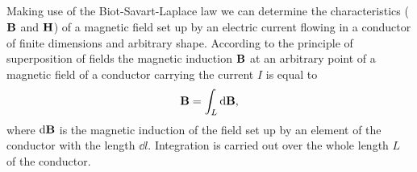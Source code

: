 \subsection{}\label{23.3.1} Making use of the Biot-Savart-Laplace law we can determine the characteristics ($\vb{B}$ and $\vb{H}$) of a magnetic field set up by an electric current flowing in a conductor of finite dimensions and arbitrary shape. According to the principle of superposition of fields  the magnetic induction $\vb{B}$ at an arbitrary point of a magnetic field of a conductor carrying the current $I$ is equal to
\begin{equation*}%
\vb{B} = \int_{L} \dd \vb{B},
\end{equation*}
where $\dd \vb{B}$ is the magnetic induction of the field set up by an element
of the conductor with the length $\dd l$. Integration is carried out over the
whole length $L$ of the conductor.

